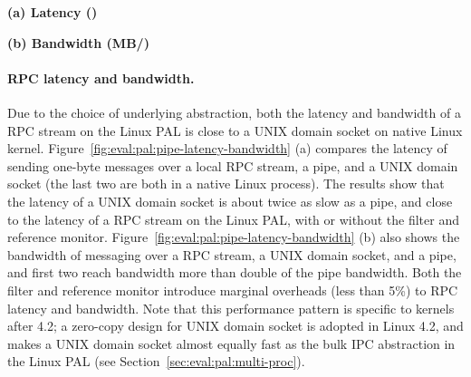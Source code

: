 \begin{figure*}[t!]
\centering
\footnotesize
{}
\parbox{0.30\textwidth}{\quad}
\parbox{0.34\textwidth}{\centering\bf (a) Latency ({\usec})}
\parbox{0.34\textwidth}{\centering\bf (b) Bandwidth (MB/\asec{})}
\caption{(a) Latency of sending a short message over RPC (lower is better), and (b) bandwidth of sending large data (higher is better).
The comparison is between (1)  and  over a pipe or an AF\_UNIX socket on Linux; (2)  and  on the Linux PAL, with and without a \seccomp{} filter ({\bf +SC}) and reference monitor ({\bf +RM}); (3) the same \hostapis{} on the \sgx{} PAL, with and without data protection ({\bf +CHK}).}
\label{fig:eval:pal:pipe-latency-bandwidth}
\end{figure*}



\paragraph{RPC latency and bandwidth.}
Due to the choice of underlying abstraction,
both the latency and bandwidth
of a RPC stream on the Linux PAL is close to a UNIX domain socket
on native Linux kernel.
Figure~\ref{fig:eval:pal:pipe-latency-bandwidth} (a)
compares
the latency of sending one-byte messages
over a local RPC stream,
a pipe, and a UNIX domain socket (the last two are both in a native Linux process).
The results
show that the latency of a UNIX domain socket
is about twice as slow as a pipe,
and close to the latency of a RPC stream
on the Linux PAL,
with or without the \seccomp{} filter and reference monitor.
Figure~\ref{fig:eval:pal:pipe-latency-bandwidth} (b)
also shows the bandwidth
of messaging over a RPC stream, a UNIX domain socket,
and a pipe,
and first two reach bandwidth
more than double of the pipe bandwidth.
Both the \seccomp{} filter and reference monitor introduce marginal overheads (less than 5\%) to RPC latency and bandwidth.
Note that this performance pattern is specific
to kernels after 4.2; a zero-copy design for UNIX domain socket
is adopted in Linux 4.2,
and makes a UNIX domain socket
almost equally fast as the bulk IPC abstraction
in the Linux PAL
(see Section~\ref{sec:eval:pal:multi-proc}). 



